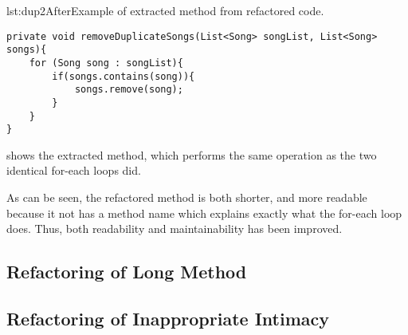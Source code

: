 
\begin{code}{lst:dup2After}{Example of extracted method from refactored code.}
\begin{lstlisting}
private void removeDuplicateSongs(List<Song> songList, List<Song> songs){
    for (Song song : songList){
        if(songs.contains(song)){
            songs.remove(song);
        }
    }
}
\end{lstlisting}
\end{code}

  shows the extracted method, which performs the same operation as the two identical for-each loops did.
 
 As can be seen, the refactored method is both shorter, and more readable because it not has a method name which explains exactly what the for-each loop does. Thus, both readability and maintainability has been improved.
\subsection{Refactoring of Long Method}
\subsection{Refactoring of Inappropriate Intimacy}
